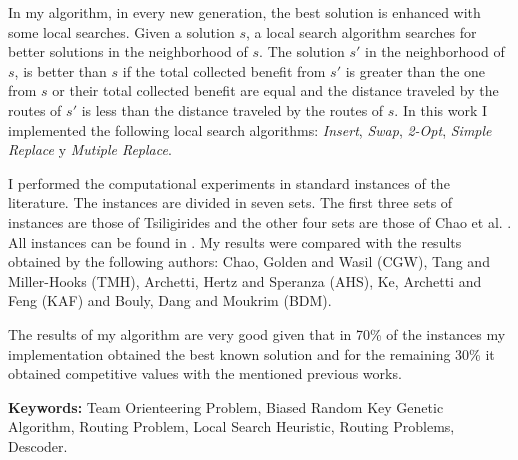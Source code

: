 \bigskip

In my algorithm, in every new generation, the best solution is enhanced with some local searches. Given a solution $s$, a local search algorithm searches for better solutions in the neighborhood of $s$. The solution $s'$ in the neighborhood of $s$, is better than $s$ if the total collected benefit from $s'$ is greater than the one from $s$ or their total collected benefit are equal and the distance traveled by the routes of $s'$ is less than the distance traveled by the routes of $s$. In this work I implemented the following local search algorithms: \textit{Insert}, \textit{Swap}, \textit{2-Opt}, \textit{Simple Replace} y \textit{Mutiple Replace}.

\bigskip

I performed the computational experiments in standard instances of the literature. The instances are divided in seven sets. The first three sets of instances are those of Tsiligirides \cite{Tsiligirides} and the other four sets are those of Chao et al. \cite{ChaoGoldenWasil}. All instances can be found in \cite{IntancesChaoTsiligirides}. My results were compared with the results obtained by the following authors: Chao, Golden and Wasil \cite{ChaoGoldenWasil} (CGW), Tang and Miller-Hooks \cite{TangMillerHooks} (TMH), Archetti, Hertz and Speranza \cite{ArchettiHertzSperanza} (AHS), Ke, Archetti and Feng \cite{KeArchettiFeng} (KAF) and Bouly, Dang and Moukrim \cite{BoulyDangMoukrim} (BDM). 

\bigskip

The results of my algorithm are very good given that in 70\% of the instances my implementation obtained the best known solution and for the remaining 30\% it obtained competitive values with the mentioned previous works.

\bigskip

\noindent\textbf{Keywords:} Team Orienteering Problem, Biased Random Key Genetic Algorithm, Routing Problem, Local Search Heuristic, Routing Problems, Descoder.